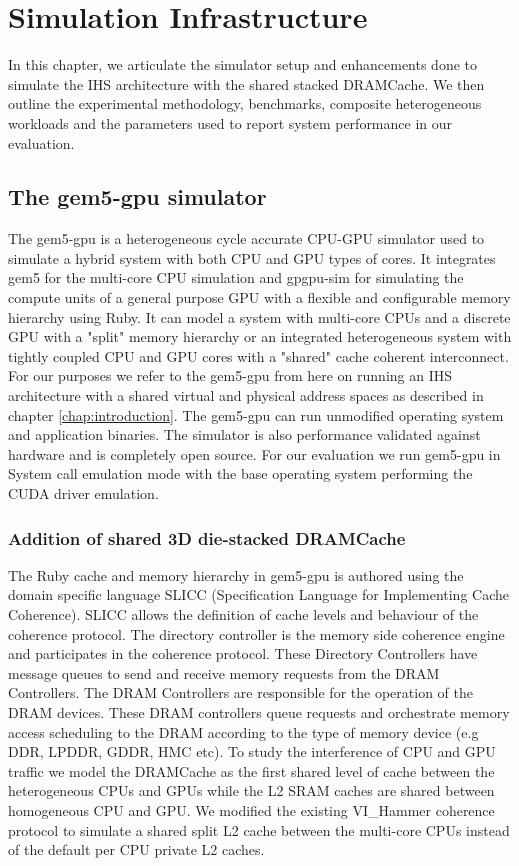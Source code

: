 \chapter{Simulation Infrastructure} \label{chap:simulator}
In this chapter, we articulate the simulator setup and enhancements done to simulate the IHS architecture with the shared stacked DRAMCache. We then outline the experimental methodology, benchmarks, composite heterogeneous workloads and the parameters used to report system performance in our evaluation.

\section{The gem5-gpu simulator} \label{gem5-gpu-simulator}
The gem5-gpu \cite{gem5-gpu} is a heterogeneous cycle accurate CPU-GPU simulator used to simulate a hybrid system with both CPU and GPU types of cores. It integrates gem5 for the multi-core CPU simulation and gpgpu-sim for simulating the compute units of a general purpose GPU with a flexible and configurable memory hierarchy using Ruby. It can model a system with multi-core CPUs and a discrete GPU with a "split" memory hierarchy or an integrated heterogeneous system with tightly coupled CPU and GPU cores with a "shared" cache coherent interconnect. For our purposes we refer to the gem5-gpu from here on running an IHS architecture with a shared virtual and physical address spaces as described in chapter \ref{chap:introduction}. The gem5-gpu can run unmodified operating system and application binaries. The simulator is also performance validated against hardware and is completely open source. For our evaluation we run gem5-gpu in System call emulation mode with the base operating system performing the CUDA driver emulation.

\subsection{Addition of shared 3D die-stacked DRAMCache}

The Ruby cache and memory hierarchy in gem5-gpu is authored using the domain specific language SLICC (Specification Language for Implementing Cache Coherence). SLICC allows the definition of cache levels and behaviour of the coherence protocol. The directory controller is the memory side coherence engine and participates in the coherence protocol. These Directory Controllers have message queues to send and receive memory requests from the DRAM Controllers. The DRAM Controllers are responsible for the operation of the DRAM devices. These DRAM controllers queue requests and orchestrate memory access scheduling to the DRAM according to the type of memory device (e.g DDR, LPDDR, GDDR, HMC etc). To study the interference of CPU and GPU traffic we model the DRAMCache as the first shared level of cache between the heterogeneous CPUs and GPUs while the L2 SRAM caches are shared between homogeneous CPU and GPU. We modified the existing VI\_Hammer coherence protocol to simulate a shared split L2 cache between the multi-core CPUs instead of the default per CPU private L2 caches.

